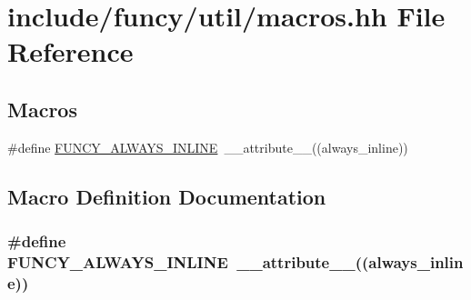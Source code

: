 \hypertarget{macros_8hh}{\section{include/funcy/util/macros.hh File Reference}
\label{macros_8hh}
}
\subsection*{Macros}
\begin{DoxyCompactItemize}
\item 
\#define \hyperlink{macros_8hh_aeb0da27a25e923327d595a79f556281d}{F\-U\-N\-C\-Y\-\_\-\-A\-L\-W\-A\-Y\-S\-\_\-\-I\-N\-L\-I\-N\-E}~\-\_\-\-\_\-attribute\-\_\-\-\_\-((always\-\_\-inline))
\end{DoxyCompactItemize}


\subsection{Macro Definition Documentation}
\hypertarget{macros_8hh_aeb0da27a25e923327d595a79f556281d}{
\subsubsection[{F\-U\-N\-C\-Y\-\_\-\-A\-L\-W\-A\-Y\-S\-\_\-\-I\-N\-L\-I\-N\-E}]{\setlength{\rightskip}{0pt plus 5cm}\#define F\-U\-N\-C\-Y\-\_\-\-A\-L\-W\-A\-Y\-S\-\_\-\-I\-N\-L\-I\-N\-E~\-\_\-\-\_\-attribute\-\_\-\-\_\-((always\-\_\-inline))}}\label{macros_8hh_aeb0da27a25e923327d595a79f556281d}

